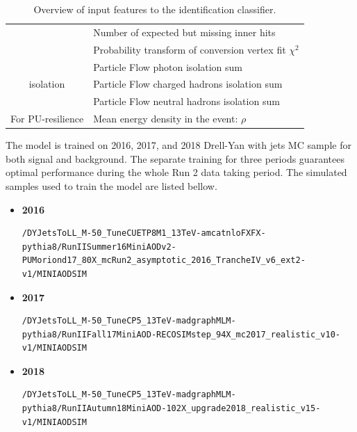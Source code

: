 \begin{table}[H]
\begin{tabular}{c|l}
   & Number of expected but missing inner hits \\ %
   & Probability transform of conversion vertex fit $\chi^2$ \\ %
\hline
\multirow{3}{*}{isolation}
   & Particle Flow photon isolation sum \\ %
   & Particle Flow charged hadrons isolation sum \\ %
   & Particle Flow neutral hadrons isolation sum \\ %
\hline
\multirow{1}{*}{For PU-resilience}
   & Mean energy density in the event: $\rho$ \\ %
\hline
\hline
     \end{tabular}
\small
    \caption{Overview of input features to the identification classifier.} %
    \label{tab:ele_ID_input_variables}
\end{table}


The model is trained on 2016, 2017, and 2018 Drell-Yan with jets MC sample for both signal and background. The separate training for three periods guarantees
optimal performance during the whole Run 2 data taking period. The simulated samples used to train the model are listed bellow.

\begin{itemize}
\item \textbf{2016} \begin{verbatim}/DYJetsToLL_M-50_TuneCUETP8M1_13TeV-amcatnloFXFX-pythia8/RunIISummer16MiniAODv2-PUMoriond17_80X_mcRun2_asymptotic_2016_TrancheIV_v6_ext2-v1/MINIAODSIM\end{verbatim}
\item \textbf{2017} \begin{verbatim}/DYJetsToLL_M-50_TuneCP5_13TeV-madgraphMLM-pythia8/RunIIFall17MiniAOD-RECOSIMstep_94X_mc2017_realistic_v10-v1/MINIAODSIM\end{verbatim}
\item \textbf{2018} \begin{verbatim}/DYJetsToLL_M-50_TuneCP5_13TeV-madgraphMLM-pythia8/RunIIAutumn18MiniAOD-102X_upgrade2018_realistic_v15-v1/MINIAODSIM\end{verbatim}
\end{itemize}

